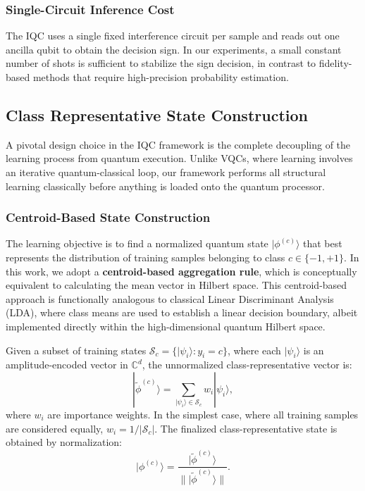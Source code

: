\documentclass[conference]{IEEEtran}
\begin{document}
\subsubsection{Single-Circuit Inference Cost}
The IQC uses a single fixed interference circuit per sample and reads out one ancilla qubit to obtain the decision sign. In our experiments, a small constant number of shots is sufficient to stabilize the sign decision, in contrast to fidelity-based methods that require high-precision probability estimation.

\subsection{Class Representative State Construction}
\label{sec:centroids}
A pivotal design choice in the IQC framework is the complete decoupling of the learning process from quantum execution. Unlike VQCs, where learning involves an iterative quantum-classical loop, our framework performs all structural learning classically before anything is loaded onto the quantum processor.

\subsubsection{Centroid-Based State Construction}
The learning objective is to find a normalized quantum state $|\phi^{(c)}\rangle$ that best represents the distribution of training samples belonging to class $c \in \{-1, +1\}$. In this work, we adopt a \textbf{centroid-based aggregation rule}, which is conceptually equivalent to calculating the mean vector in Hilbert space. This centroid-based approach is functionally analogous to classical Linear Discriminant Analysis (LDA), where class means are used to establish a linear decision boundary, albeit implemented directly within the high-dimensional quantum Hilbert space.

Given a subset of training states $\mathcal{S}_c = \{|\psi_i\rangle : y_i = c\}$, where each $|\psi_i\rangle$ is an amplitude-encoded vector in $\mathbb{C}^d$, the unnormalized class-representative vector is:
\begin{equation}
| \tilde{\phi}^{(c)} \rangle = \sum_{|\psi_i\rangle \in \mathcal{S}_c} w_i |\psi_i\rangle,
\end{equation}
where $w_i$ are importance weights. In the simplest case, where all training samples are considered equally, $w_i = 1/|\mathcal{S}_c|$. The finalized class-representative state is obtained by normalization:
\begin{equation}
|\phi^{(c)}\rangle = \frac{| \tilde{\phi}^{(c)} \rangle}{\| | \tilde{\phi}^{(c)} \rangle \|}.
\end{equation}
\end{document}
